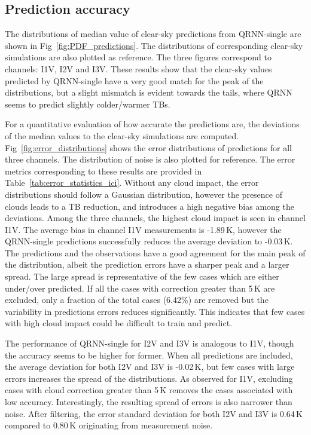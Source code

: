 \documentclass[amt, manuscript]{copernicus}
\begin{document}
\subsection{Prediction accuracy}
%
The distributions of median value of clear-sky predictions from QRNN-single are shown in Fig~\ref{fig:PDF_predictions}. The distributions of corresponding clear-sky simulations are also plotted as reference. The three figures correspond to channels: I1V, I2V and I3V. These results show that the clear-sky values predicted by QRNN-single have a very good match for the peak of the distributions, but a slight mismatch is evident towards the tails, where QRNN seems to predict slightly colder/warmer TBs. 

For a quantitative evaluation of how accurate the predictions are, the  deviations of the median values to the clear-sky simulations are computed. Fig~\ref{fig:error_distributions} shows the error distributions of predictions for all three channels. The distribution of noise is also plotted for reference. The error metrics corresponding to these results are provided in Table~\ref{tab:error_statistics_ici}. Without any cloud impact, the error distributions should follow a Gaussian distribution, however the presence of clouds leads to a TB reduction, and introduces a high negative bias among the deviations. Among the three channels, the highest cloud impact is seen in channel I1V. The average bias in channel I1V measurements is -1.89\,K, however the QRNN-single predictions successfully reduces the average deviation to -0.03\,K. The predictions and the observations have a good agreement for the main peak of the distribution, albeit the prediction errors have a sharper peak and a larger spread.  The large spread is representative of the few cases which are either under/over predicted. If all the cases with correction greater than 5\,K are excluded, only a fraction of the total cases (6.42\%) are removed but the variability in predictions errors reduces significantly. This indicates that few cases with high cloud impact could be difficult to train and predict.    

The performance of QRNN-single for I2V and I3V is analogous to I1V, though the accuracy seems to be higher for former. When all predictions are included, the average deviation for both I2V and I3V is -0.02\,K, but few cases with large errors increases the spread of the distributions. As observed for I1V, excluding cases with cloud correction greater than 5\,K removes the cases associated with low accuracy. Interestingly, the resulting spread of errors is also narrower than noise. After filtering, the error standard deviation for both I2V and I3V is 0.64\,K compared to 0.80\,K originating from measurement noise.
\end{document}
